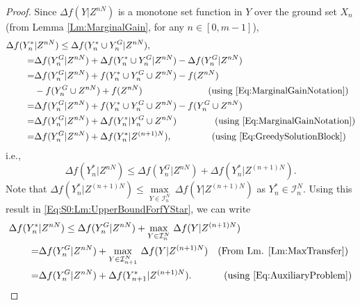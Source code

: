 \documentclass[letterpaper, 10 pt, conference]{ieeeconf}
\begin{document}
{\begin{proof}
Since $\Delta f(Y \vert Z^{nN})$ is a monotone set function in $Y$ over the ground set $X_n$ (from Lemma \ref{Lm:MarginalGain}, for any $n\in[0,m-1]$), 
\begin{align}
    \Delta f(Y^*_n &\vert Z^{nN}) 
    \leq \Delta f(Y^*_n\cup Y^G_n \vert Z^{nN}), \nonumber \\
    =& \Delta f(Y^G_n \vert Z^{nN}) + \Delta f(Y^*_n\cup Y^G_n \vert Z^{nN}) - \Delta f(Y^G_n \vert Z^{nN}) \nonumber \\
    =& \Delta f(Y^G_n \vert Z^{nN}) + f(Y^*_n\cup Y^G_n\cup Z^{nN}) - f(Z^{nN}) \nonumber \\
    &- f(Y^G_n \cup Z^{nN}) + f(Z^{nN}) 
    \quad \quad \quad \quad \quad \quad \quad \, \mbox{(using \eqref{Eq:MarginalGainNotation})} \nonumber \\
    =& \Delta f(Y^G_n \vert Z^{nN}) + f(Y^*_n\cup Y^G_n\cup Z^{nN}) - f(Y^G_n \cup Z^{nN}) \nonumber \\
    =& \Delta f(Y^G_n \vert Z^{nN}) + \Delta f(Y^*_n \vert Y^G_n \cup Z^{nN}) 
    \quad \quad \quad \quad \, \mbox{(using \eqref{Eq:MarginalGainNotation})}  \nonumber \\
    =& \Delta f(Y^G_n \vert Z^{nN}) + \Delta f(Y^*_n \vert Z^{(n+1)N}), \quad \quad \quad \quad \ \mbox{(using \eqref{Eq:GreedySolutionBlock})} \nonumber
\end{align}
i.e., 
\begin{equation}\label{Eq:S0:Lm:UpperBoundForfYStar}
\Delta f(Y^*_n \vert Z^{nN}) \leq \Delta f(Y^G_n \vert Z^{nN}) + \Delta f(Y^*_n \vert Z^{(n+1)N}).   
\end{equation}
Note that $\Delta f(Y^*_n \vert Z^{(n+1)N}) \leq \underset{Y \in \mathcal{I}^N_{n}}{\max}\ \Delta f(Y \vert Z^{(n+1)N})$ as $Y^*_n \in \mathcal{I}^N_n$. Using this result in \eqref{Eq:S0:Lm:UpperBoundForfYStar}, we can write
\begin{align}
    \Delta f(Y^*_n &\vert Z^{nN}) 
    \leq \Delta f(Y^G_n \vert Z^{nN}) + \underset{Y \in \mathcal{I}^N_{n}}{\max}\ \Delta f(Y \vert Z^{(n+1)N}) \nonumber\\
    =& \Delta f(Y^G_n \vert Z^{nN}) + \underset{Y \in \mathcal{I}^N_{n+1}}{\max}\ \Delta f(Y \vert Z^{(n+1)N}) 
    \quad \mbox{(From Lm. \ref{Lm:MaxTransfer})} \nonumber\\
    =& \Delta f(Y^G_n \vert Z^{nN}) + \Delta f(Y^*_{n+1} \vert Z^{(n+1)N}). 
    \quad \quad \quad \ \mbox{(using \eqref{Eq:AuxiliaryProblem})} \nonumber
\end{align}



\end{proof}}
\end{document}
